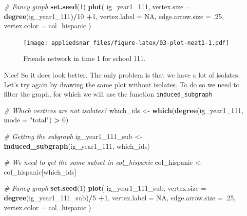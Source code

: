 \documentclass[]{book}
\newenvironment{Shaded}{\begin{snugshade}}{\end{snugshade}}
\newcommand{\KeywordTok}[1]{\textcolor[rgb]{0.13,0.29,0.53}{\textbf{#1}}}
\newcommand{\DataTypeTok}[1]{\textcolor[rgb]{0.13,0.29,0.53}{#1}}
\newcommand{\DecValTok}[1]{\textcolor[rgb]{0.00,0.00,0.81}{#1}}
\newcommand{\StringTok}[1]{\textcolor[rgb]{0.31,0.60,0.02}{#1}}
\newcommand{\CommentTok}[1]{\textcolor[rgb]{0.56,0.35,0.01}{\textit{#1}}}
\newcommand{\OtherTok}[1]{\textcolor[rgb]{0.56,0.35,0.01}{#1}}
\newcommand{\OperatorTok}[1]{\textcolor[rgb]{0.81,0.36,0.00}{\textbf{#1}}}
\newcommand{\NormalTok}[1]{#1}
\theoremstyle{definition}
\theoremstyle{definition}
\theoremstyle{definition}
\theoremstyle{remark}
\begin{document}
\begin{Shaded}
\begin{Highlighting}[]
\CommentTok{# Fancy graph}
\KeywordTok{set.seed}\NormalTok{(}\DecValTok{1}\NormalTok{)}
\KeywordTok{plot}\NormalTok{(}
\NormalTok{  ig_year1_}\DecValTok{111}\NormalTok{,}
  \DataTypeTok{vertex.size     =} \KeywordTok{degree}\NormalTok{(ig_year1_}\DecValTok{111}\NormalTok{)}\OperatorTok{/}\DecValTok{10} \OperatorTok{+}\DecValTok{1}\NormalTok{,}
  \DataTypeTok{vertex.label    =} \OtherTok{NA}\NormalTok{,}
  \DataTypeTok{edge.arrow.size =}\NormalTok{ .}\DecValTok{25}\NormalTok{,}
  \DataTypeTok{vertex.color    =}\NormalTok{ col_hispanic}
\NormalTok{  )}
\end{Highlighting}
\end{Shaded}

\begin{figure}
\centering
\texttt{[image: appliedsnar\_files/figure-latex/03-plot-neat1-1.pdf]}
\caption{\label{fig:03-plot-neat1}Friends network in time 1 for school 111.}
\end{figure}

Nice! So it does look better. The only problem is that we have a lot of
isolates. Let's try again by drawing the same plot without isolates. To
do so we need to filter the graph, for which we will use the function
\texttt{induced\_subgraph}

\begin{Shaded}
\begin{Highlighting}[]
\CommentTok{# Which vertices are not isolates?}
\NormalTok{which_ids <-}\StringTok{ }\KeywordTok{which}\NormalTok{(}\KeywordTok{degree}\NormalTok{(ig_year1_}\DecValTok{111}\NormalTok{, }\DataTypeTok{mode =} \StringTok{"total"}\NormalTok{) }\OperatorTok{>}\StringTok{ }\DecValTok{0}\NormalTok{)}

\CommentTok{# Getting the subgraph}
\NormalTok{ig_year1_111_sub <-}\StringTok{ }\KeywordTok{induced_subgraph}\NormalTok{(ig_year1_}\DecValTok{111}\NormalTok{, which_ids)}

\CommentTok{# We need to get the same subset in col_hispanic}
\NormalTok{col_hispanic <-}\StringTok{ }\NormalTok{col_hispanic[which_ids]}
\end{Highlighting}
\end{Shaded}

\begin{Shaded}
\begin{Highlighting}[]
\CommentTok{# Fancy graph}
\KeywordTok{set.seed}\NormalTok{(}\DecValTok{1}\NormalTok{)}
\KeywordTok{plot}\NormalTok{(}
\NormalTok{  ig_year1_111_sub,}
  \DataTypeTok{vertex.size     =} \KeywordTok{degree}\NormalTok{(ig_year1_111_sub)}\OperatorTok{/}\DecValTok{5} \OperatorTok{+}\DecValTok{1}\NormalTok{,}
  \DataTypeTok{vertex.label    =} \OtherTok{NA}\NormalTok{,}
  \DataTypeTok{edge.arrow.size =}\NormalTok{ .}\DecValTok{25}\NormalTok{,}
  \DataTypeTok{vertex.color    =}\NormalTok{ col_hispanic}
\NormalTok{  )}
\end{Highlighting}
\end{Shaded}
\end{document}
